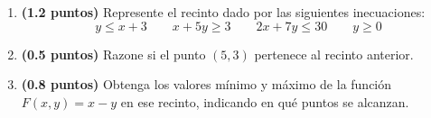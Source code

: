 
\begin{enumerate}[label=\alph*)]
\item \textbf{(1.2 puntos)} Represente el recinto dado por las siguientes inecuaciones:
\[
y\leq x+3\qquad x+5y\geq 3\qquad 2x+7y\leq 30\qquad y\geq 0
\]
\item \textbf{(0.5 puntos)} Razone si el punto $(5,3)$ pertenece al recinto anterior.
\item \textbf{(0.8 puntos)} Obtenga los valores mínimo y máximo de la función $F(x,y)=x-y$ en ese recinto, indicando en qué puntos se alcanzan.
\end{enumerate}
